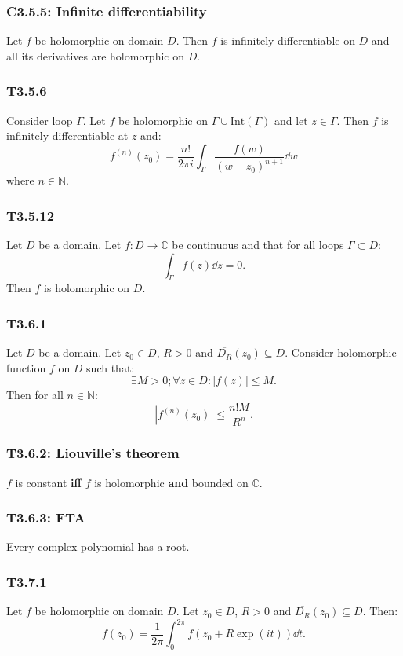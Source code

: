 \documentclass{article}
\begin{document}
\begin{multicols*}{3}
\subsubsection*{C3.5.5: Infinite differentiability}
Let $f$ be holomorphic on domain $D$. Then $f$ is infinitely
differentiable on $D$ and all its derivatives are holomorphic on $D$.

\subsubsection*{T3.5.6}
Consider loop $\Gamma$. Let $f$ be holomorphic on
$\Gamma\cup\text{Int}(\Gamma)$ and let $z\in\Gamma$. Then $f$ is
infinitely differentiable at $z$ and:
$$f^{(n)}(z_0)=\frac{n!}{2\pi i}\int_{\Gamma}
\frac{f(w)}{(w-z_0)^{n+1}}\dd w$$
where $n\in\mathbb{N}$.

\newcolumn

\subsubsection*{T3.5.12}
Let $D$ be a domain. Let $f:D\rightarrow\mathbb{C}$ be continuous
and that for all loops $\Gamma\subset D$:
$$\int_{\Gamma}f(z)\dd z=0.$$
Then $f$ is holomorphic on $D$.

\subsubsection*{T3.6.1}
Let $D$ be a domain. Let $z_0\in D$, $R>0$ and
$\overline{D_R}(z_0)\subseteq D$.
Consider holomorphic function $f$ on $D$ such that:
$$\exists M>0;\forall z\in D:|f(z)|\leq M.$$
Then for all $n\in\mathbb{N}$:
$$|f^{(n)}(z_0)|\leq\frac{n! M}{R^n}.$$

\subsubsection*{T3.6.2: Liouville's theorem}
$f$ is constant \textbf{if{}f} $f$ is holomorphic 
\textbf{and} bounded on $\mathbb{C}$.

\subsubsection*{T3.6.3: FTA}
Every complex polynomial has a root.

\subsubsection*{T3.7.1}
Let $f$ be holomorphic on domain $D$. Let $z_0\in D$, $R>0$ and
$\overline{D_R}(z_0)\subseteq D$. Then:
$$f(z_0)=\frac{1}{2\pi}\int_{0}^{2\pi}f(z_0+R\exp(it))\dd t.$$


\end{multicols*}
\end{document}
